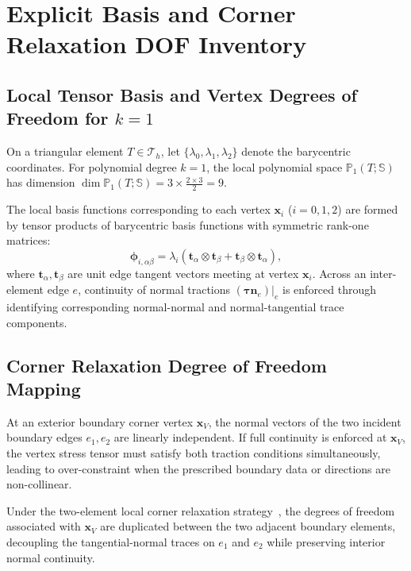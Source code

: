 \section{Explicit Basis and Corner Relaxation DOF Inventory}
\label{app:explicit_basis}

\subsection{Local Tensor Basis and Vertex Degrees of Freedom for $k=1$}
\label{app:basis_k1}

On a triangular element $T \in \mathcal{T}_h$, let $\{\lambda_0, \lambda_1, \lambda_2\}$ denote the barycentric coordinates. For polynomial degree $k=1$, the local polynomial space $\mathbb{P}_1(T;\mathbb{S})$ has dimension $\dim \mathbb{P}_1(T;\mathbb{S}) = 3 \times \frac{2 \times 3}{2} = 9$. 

The local basis functions corresponding to each vertex $\boldsymbol{x}_i$ ($i=0,1,2$) are formed by tensor products of barycentric basis functions with symmetric rank-one matrices:
\begin{equation}
\boldsymbol{\phi}_{i, \alpha\beta} = \lambda_i (\boldsymbol{t}_\alpha \otimes \boldsymbol{t}_\beta + \boldsymbol{t}_\beta \otimes \boldsymbol{t}_\alpha),
\end{equation}
where $\boldsymbol{t}_\alpha, \boldsymbol{t}_\beta$ are unit edge tangent vectors meeting at vertex $\boldsymbol{x}_i$. Across an inter-element edge $e$, continuity of normal tractions $(\boldsymbol{\tau}\boldsymbol{n}_e)|_e$ is enforced through identifying corresponding normal-normal and normal-tangential trace components.

\subsection{Corner Relaxation Degree of Freedom Mapping}
\label{app:corner_relaxation_map}

At an exterior boundary corner vertex $\boldsymbol{x}_V$, the normal vectors of the two incident boundary edges $e_1, e_2$ are linearly independent. If full continuity is enforced at $\boldsymbol{x}_V$, the vertex stress tensor must satisfy both traction conditions simultaneously, leading to over-constraint when the prescribed boundary data or directions are non-collinear.

Under the two-element local corner relaxation strategy~\cite{HuMa2021}, the degrees of freedom associated with $\boldsymbol{x}_V$ are duplicated between the two adjacent boundary elements, decoupling the tangential-normal traces on $e_1$ and $e_2$ while preserving interior normal continuity.
